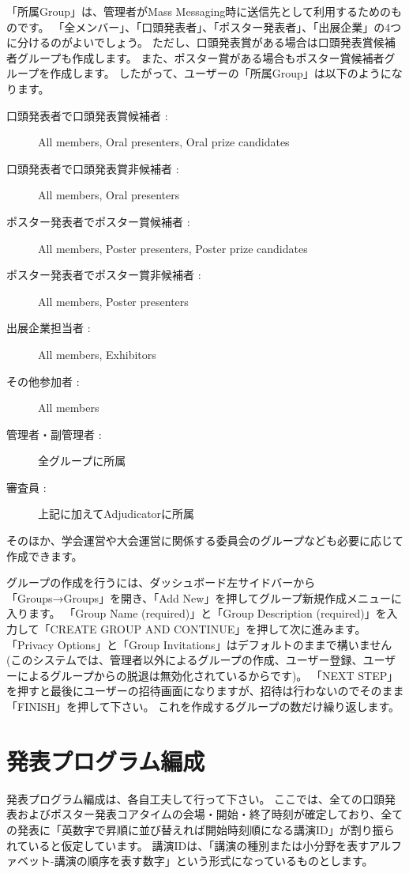 \documentclass[titlepage,10pt,a4paper,uplatex]{jsbook}
\begin{document}
「所属Group」は、管理者がMass Messaging時に送信先として利用するためのものです。
「全メンバー」、「口頭発表者」、「ポスター発表者」、「出展企業」の4つに分けるのがよいでしょう。
ただし、口頭発表賞がある場合は口頭発表賞候補者グループも作成します。
また、ポスター賞がある場合もポスター賞候補者グループを作成します。
したがって、ユーザーの「所属Group」は以下のようになります。

\begin{description}
\item[口頭発表者で口頭発表賞候補者 : ] All members, Oral presenters, Oral prize candidates
\item[口頭発表者で口頭発表賞非候補者 : ] All members, Oral presenters
\item[ポスター発表者でポスター賞候補者 : ] All members, Poster presenters, Poster prize candidates
\item[ポスター発表者でポスター賞非候補者 : ] All members, Poster presenters
\item[出展企業担当者 : ] All members, Exhibitors
\item[その他参加者 : ] All members
\item[管理者・副管理者 : ] 全グループに所属
\item[審査員 : ] 上記に加えてAdjudicatorに所属
\end{description}

そのほか、学会運営や大会運営に関係する委員会のグループなども必要に応じて作成できます。

グループの作成を行うには、ダッシュボード左サイドバーから「Groups→Groups」を開き、「Add New」を押してグループ新規作成メニューに入ります。
「Group Name (required)」と「Group Description (required)」を入力して「CREATE GROUP AND CONTINUE」を押して次に進みます。
「Privacy Options」と「Group Invitations」はデフォルトのままで構いません(このシステムでは、管理者以外によるグループの作成、ユーザー登録、ユーザーによるグループからの脱退は無効化されているからです)。
「NEXT STEP」を押すと最後にユーザーの招待画面になりますが、招待は行わないのでそのまま「FINISH」を押して下さい。
これを作成するグループの数だけ繰り返します。

\section{発表プログラム編成}

発表プログラム編成は、各自工夫して行って下さい。
ここでは、全ての口頭発表およびポスター発表コアタイムの会場・開始・終了時刻が確定しており、全ての発表に「英数字で昇順に並び替えれば開始時刻順になる講演ID」が割り振られていると仮定しています。
講演IDは、「講演の種別または小分野を表すアルファベット-講演の順序を表す数字」という形式になっているものとします。
\end{document}
